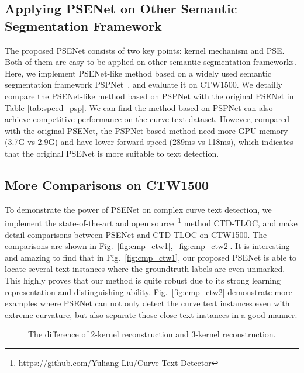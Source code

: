\documentclass[10pt,twocolumn,letterpaper]{article}
\begin{document}
	\subsection{Applying PSENet on Other Semantic Segmentation Framework}
	The proposed PSENet consists of two key points: kernel mechanism and PSE. Both of them are easy to be applied on other semantic segmentation frameworks. Here, we implement PSENet-like method based on a widely used semantic segmentation framework PSPNet~\cite{zhao2017pyramid}, and evaluate it on CTW1500. We detailly compare the PSENet-like method based on PSPNet with the original PSENet in Table \ref{tab:speed_psp}. We can find the method based on PSPNet can also achieve competitive performance on the curve text dataset. However, compared with the original PSENet, the PSPNet-based method need more GPU memory (3.7G vs 2.9G) and have lower forward speed (289ms vs 118ms), which indicates that the original PSENet is more suitable to text detection.
	
	\subsection{More Comparisons on CTW1500}
	To demonstrate the power of PSENet on complex curve text detection, we implement the state-of-the-art and open source~\footnote{https://github.com/Yuliang-Liu/Curve-Text-Detector} method CTD-TLOC, and make detail comparisons between PSENet and CTD-TLOC on CTW1500.
	The comparisons are shown in Fig.~\ref{fig:cmp_ctw1},~\ref{fig:cmp_ctw2}. 
	It is interesting and amazing to find that in Fig.~\ref{fig:cmp_ctw1}, our proposed PSENet is able to locate several text instances where the groundtruth labels are even unmarked. This highly proves that our method is quite robust due to its strong learning representation and distinguishing ability. Fig.~\ref{fig:cmp_ctw2} demonstrate more examples where PSENet can not only detect the curve text instances even with extreme curvature, but also separate those close text instances in a good manner.
	
	\begin{figure}[t]
		\centering
		\setlength{\fboxrule}{0pt}
		\caption{The difference of 2-kernel reconstruction and 3-kernel reconstruction.}
		\label{fig:kernel_num_fig}
	\end{figure}
\end{document}
